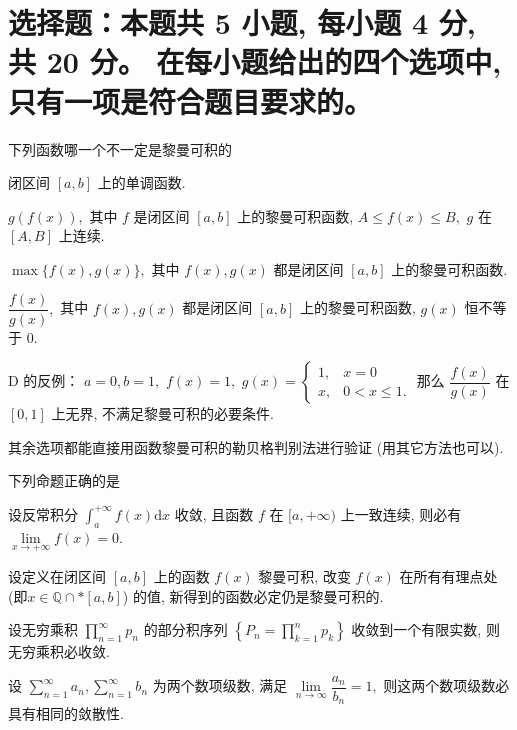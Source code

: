 


\makeexamtitle


\section{%
  选择题：本题共 5 小题, 每小题 4 分, 共 20 分。
  在每小题给出的四个选项中, 只有一项是符合题目要求的。
}


\begin{question}
下列函数哪一个不一定是黎曼可积的 \paren[D]

\begin{choices}
\item 闭区间 $[a, b]$ 上的单调函数.
\item $g(f(x)),$ 其中 $f$ 是闭区间 $[a, b]$ 上的黎曼可积函数, $A \leqslant f(x) \leqslant B,$ $g$ 在 $[A, B]$ 上连续.
\item $\max\{f(x), g(x)\},$ 其中 $f(x), g(x)$ 都是闭区间 $[a, b]$ 上的黎曼可积函数.
\item $\dfrac{f(x)}{g(x)},$ 其中 $f(x), g(x)$ 都是闭区间 $[a, b]$ 上的黎曼可积函数, $g(x)$ 恒不等于 $0.$
\end{choices}
\end{question}

\begin{solution}
D 的反例： $a = 0, b = 1,$ $f(x) = 1,$ $g(x) = \begin{cases}
1, & x = 0 \\ x, & 0 < x \leqslant 1.
\end{cases}$ 那么 $\dfrac{f(x)}{g(x)}$ 在 $[0, 1]$ 上无界, 不满足黎曼可积的必要条件.

其余选项都能直接用函数黎曼可积的勒贝格判别法进行验证 (用其它方法也可以).
\end{solution}

\begin{question}
下列命题正确的是 \paren[A]

\begin{choices}
\item 设反常积分 $\int_a^{+\infty} f(x) \mathrm{d} x$ 收敛, 且函数 $f$ 在 $[a, +\infty)$ 上一致连续, 则必有 $\lim\limits_{x \to +\infty} f(x) = 0.$
\item 设定义在闭区间 $[a, b]$ 上的函数 $f(x)$ 黎曼可积, 改变 $f(x)$ 在所有有理点处 (即$x \in \mathbb{Q} \cap* [a, b]$) 的值, 新得到的函数必定仍是黎曼可积的.
\item 设无穷乘积 $\prod\limits_{n=1}^{\infty} p_n$ 的部分积序列 $\left\{ P_n = \prod\limits_{k=1}^{n} p_k \right\}$ 收敛到一个有限实数, 则无穷乘积必收敛.
\item 设 $\sum\limits_{n=1}^{\infty} a_n, \sum\limits_{n=1}^{\infty} b_n$ 为两个数项级数, 满足 $\lim\limits_{n\to\infty} \dfrac{a_n}{b_n} = 1,$ 则这两个数项级数必具有相同的敛散性.
\end{choices}
\end{question}

